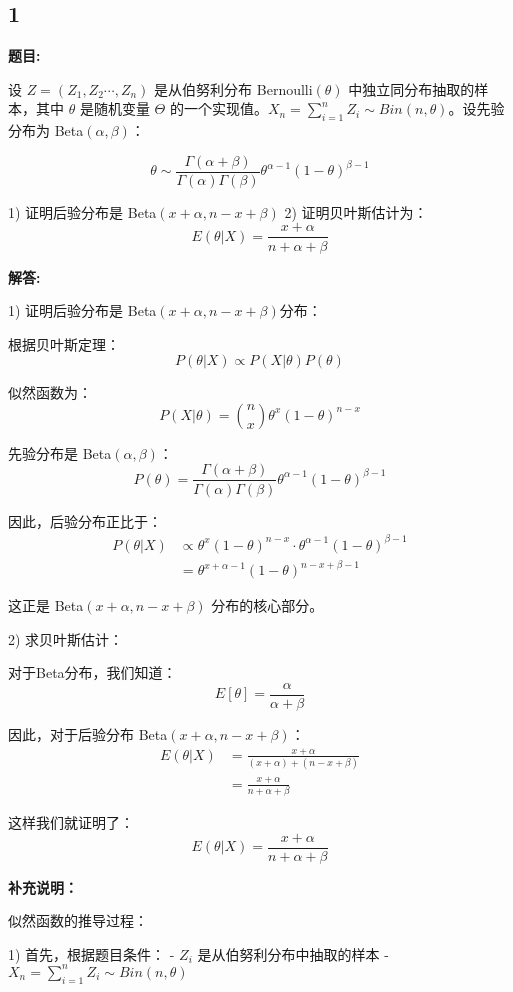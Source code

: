 \documentclass[UTF8]{report}
\theoremstyle{MyLineTheoremStyle} %
\theoremstyle{MyBlockTheoremStyle} %
\theoremstyle{MySubsubsectionStyle} %
\begin{document}
\subsection{1}
\textbf{题目:}

设 $Z = (Z_1,Z_2\cdots, Z_n)$ 是从伯努利分布 Bernoulli$(\theta)$ 中独立同分布抽取的样本，其中 $\theta$ 是随机变量 $\Theta$ 的一个实现值。$X_n = \sum_{i=1}^n Z_i \sim Bin(n,\theta)$。设先验分布为 Beta$(\alpha,\beta)$：

$$
\theta \sim \frac{\Gamma(\alpha+\beta)}{\Gamma(\alpha)\Gamma(\beta)}\theta^{\alpha-1}(1-\theta)^{\beta-1}
$$

1) 证明后验分布是 Beta$(x+\alpha, n-x+\beta)$
2) 证明贝叶斯估计为：
$$
E(\theta|X) = \frac{x+\alpha}{n+\alpha+\beta}
$$

\textbf{解答:}

1) 证明后验分布是 Beta$(x+\alpha, n-x+\beta)$分布：

根据贝叶斯定理：
$$
P(\theta|X) \propto P(X|\theta)P(\theta)
$$

似然函数为：
$$
P(X|\theta) = \binom{n}{x}\theta^x(1-\theta)^{n-x}
$$

先验分布是 Beta$(\alpha,\beta)$：
$$
P(\theta) = \frac{\Gamma(\alpha+\beta)}{\Gamma(\alpha)\Gamma(\beta)}\theta^{\alpha-1}(1-\theta)^{\beta-1}
$$

因此，后验分布正比于：
$$
\begin{aligned}
P(\theta|X) &\propto \theta^x(1-\theta)^{n-x} \cdot \theta^{\alpha-1}(1-\theta)^{\beta-1} \\
&= \theta^{x+\alpha-1}(1-\theta)^{n-x+\beta-1}
\end{aligned}
$$

这正是 Beta$(x+\alpha, n-x+\beta)$ 分布的核心部分。

2) 求贝叶斯估计：

对于Beta分布，我们知道：
$$
E[\theta] = \frac{\alpha}{\alpha+\beta}
$$

因此，对于后验分布 Beta$(x+\alpha, n-x+\beta)$：
$$
\begin{aligned}
E(\theta|X) &= \frac{x+\alpha}{(x+\alpha)+(n-x+\beta)} \\
&= \frac{x+\alpha}{n+\alpha+\beta}
\end{aligned}
$$

这样我们就证明了：
$$
E(\theta|X) = \frac{x+\alpha}{n+\alpha+\beta}
$$


\textbf{补充说明：}

似然函数的推导过程：

1) 首先，根据题目条件：
   - $Z_i$ 是从伯努利分布中抽取的样本
   - $X_n = \sum_{i=1}^n Z_i \sim Bin(n,\theta)$
\end{document}
